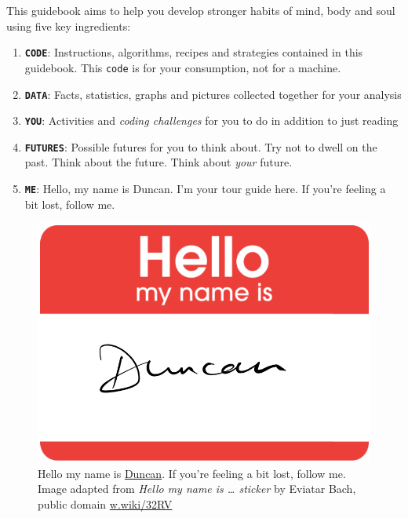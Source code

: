 \documentclass[
]{book}
\providecommand{\tightlist}{%
  \setlength{\itemsep}{0pt}\setlength{\parskip}{0pt}}
\begin{document}
This guidebook aims to help you develop stronger habits of mind, body and soul using five key ingredients:

\begin{enumerate}
\def\labelenumi{\arabic{enumi}.}
\tightlist
\item
  \textbf{\texttt{CODE}}: Instructions, algorithms, recipes and strategies contained in this guidebook. This \texttt{code} is for your consumption, not for a machine.
\item
  \textbf{\texttt{DATA}}: Facts, statistics, graphs and pictures collected together for your analysis
\item
  \textbf{\texttt{YOU}}: Activities and \emph{coding challenges} for you to do in addition to just reading
\item
  \textbf{\texttt{FUTURES}}: Possible futures for you to think about. Try not to dwell on the past. Think about the future. Think about \emph{your} future. \citep{thinkaboutthefuture, wroteforluck}
\item
  \textbf{\texttt{ME}}: Hello, my name is Duncan. I'm your tour guide here. If you're feeling a bit lost, follow me.
\end{enumerate}

\begin{figure}

{\centering \includegraphics[width=0.69\linewidth]{images/Hello-my-name-is-Duncan} 

}

\caption{Hello my name is \href{https://en.wikipedia.org/wiki/Duncan_(given_name)}{Duncan}. If you're feeling a bit lost, follow me. Image adapted from \emph{Hello my name is \ldots{} sticker} by Eviatar Bach, public domain \href{https://w.wiki/32RV}{w.wiki/32RV}}\label{fig:hello-my-name-fig}
\end{figure}
\end{document}
